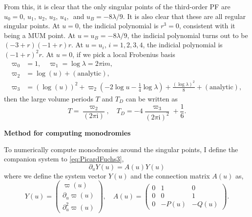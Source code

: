 \documentclass[11pt, a4paper]{article}
\newcommand{\ii}{\mathrm{i}}
\numberwithin{equation}{section}
\begin{document}
From this, it is clear that the only singular points of the third-order PF are $u_0 = 0,\, u_1,\, u_2,\, u_3,\, u_4,\,$ and $u_B = -8\lambda/9$. It is also clear that these are all regular singular points. At $u = 0$, the indicial polynomial is $r^3 = 0$, consistent with it being a MUM point. At $u = u_B = -8\lambda/9$, the indicial polynomial turns out to be $(-3 + r) (-1 + r) r$. At $u = u_i$, $i = 1, 2, 3, 4$, the indicial polynomial is $(-1 + r)^2 r$. At $u = 0$, if we pick a local Frobenius basis
\begin{align}
  \varpi_0 &= 1, \quad \varpi_1 = \log \lambda = 2 \pi \ii m, \\ \varpi_2 &= \log(u) + (\text{analytic}), \\ \varpi_3 &= (\log(u))^2 + \varpi_2 (-2 \log u - \frac{1}{4} \log\lambda) + \frac{(\log \lambda)^2}{8} + (\text{analytic}),
\end{align}
then the large volume periods $T$ and $T_D$ can be written as
\begin{equation}
  T = \frac{\varpi_2}{(2\pi \ii)}, \quad T_D = -4 \frac{\varpi_3}{(2\pi \ii)^2} + \frac{1}{6}.
\end{equation}

\textbf{Method for computing monodromies}

To numerically compute monodromies around the singular points, I define the companion system to \cref{eq:PicardFuchs3},
\begin{equation}
  \partial_u Y(u) = A(u) Y(u)
\end{equation}
where we define the system vector $Y(u)$ and the connection matrix $A(u)$ as,
\begin{equation}
  Y(u) = \begin{pmatrix}
    \varpi(u) \\ \partial_u \varpi(u) \\ \partial_u^2 \varpi(u)
  \end{pmatrix}, \quad A(u) = \begin{pmatrix}
      0 & 1 & 0 \\ 0 & 0 & 1 \\ 0 & -P(u) & -Q(u)
    \end{pmatrix}.
\end{equation}
\end{document}
